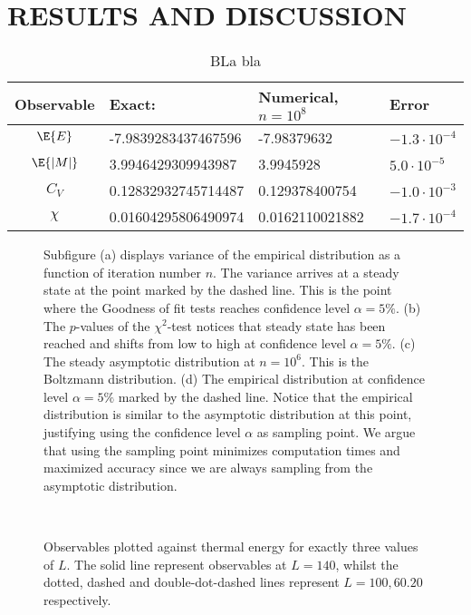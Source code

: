 \documentclass[11pt,english,a4paper]{article}
\begin{document}
\section*{\uppercase{Results and discussion}}
\begin{table}[!h]
\center
\begin{tabular}{c l l l}
Observable&Exact:					& Numerical, $n = 10^8$& Error\\
\hline
$\E{E}$ & -7.9839283437467596		& -7.98379632& $-1.3\cdot 10^{-4}$\\
$\E{|M|}$ & 3.9946429309943987		& 3.9945928& $5.0\cdot 10^{-5}$\\
$C_V$ & 0.12832932745714487	& 0.129378400754& $-1.0\cdot 10^{-3}$\\
$\chi$ & 0.01604295806490974		& 0.0162110021882& $-1.7\cdot 10^{-4}$
\end{tabular}
\caption{BLa bla} \label{tab:errors}
\end{table}

\begin{figure}
\center

\caption{Subfigure (a) displays variance of the empirical distribution as a function of iteration number $n$. The variance arrives at a steady state at the point marked by the dashed line. This is the point where the Goodness of fit tests reaches confidence level $\alpha=5\%$. (b) The $p$-values of the $\chi^2$-test notices that steady state has been reached and shifts from low to high at confidence level $\alpha=5\%$. (c) The steady asymptotic distribution at $n = 10^6$. This is the Boltzmann distribution. (d) The empirical distribution at confidence level $\alpha=5\%$ marked by the dashed line. Notice that the empirical distribution is similar to the asymptotic distribution at this point, justifying using the confidence level $\alpha$ as sampling point. We argue that using the sampling point minimizes computation times and maximized accuracy since we are always sampling from the asymptotic distribution.}
\end{figure}


\begin{figure}
\center
\\

\caption{Observables plotted against thermal energy for exactly three values of $L$. The solid line represent observables at $L=140$, whilst the dotted, dashed and double-dot-dashed lines represent $L = 100,60.20$ respectively.}
\end{figure}
\end{document}
